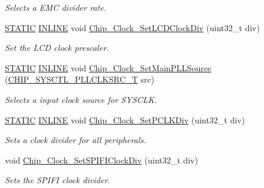 \begin{DoxyCompactItemize}
\begin{DoxyCompactList}\small\item\em Selects a E\+MC divider rate. \end{DoxyCompactList}\item 
\hyperlink{group__LPC__Types__Public__Macros_ga10b2d890d871e1489bb02b7e70d9bdfb}{S\+T\+A\+T\+IC} \hyperlink{group__LPC__Types__Public__Types_ga2eb6f9e0395b47b8d5e3eeae4fe0c116}{I\+N\+L\+I\+NE} void \hyperlink{group__CLOCK__17XX__40XX_ga1ce42fc25d5a91dadf0d7c6c9b3c3f34}{Chip\+\_\+\+Clock\+\_\+\+Set\+L\+C\+D\+Clock\+Div} (uint32\+\_\+t div)
\begin{DoxyCompactList}\small\item\em Set the L\+CD clock prescaler. \end{DoxyCompactList}\item 
\hyperlink{group__LPC__Types__Public__Macros_ga10b2d890d871e1489bb02b7e70d9bdfb}{S\+T\+A\+T\+IC} \hyperlink{group__LPC__Types__Public__Types_ga2eb6f9e0395b47b8d5e3eeae4fe0c116}{I\+N\+L\+I\+NE} void \hyperlink{group__CLOCK__17XX__40XX_gadeba4ec298c7ad2cf1627f9add199d02}{Chip\+\_\+\+Clock\+\_\+\+Set\+Main\+P\+L\+L\+Source} (\hyperlink{group__CLOCK__17XX__40XX_gacda7fd6d13922330ce9344dbc4ec85b7}{C\+H\+I\+P\+\_\+\+S\+Y\+S\+C\+T\+L\+\_\+\+P\+L\+L\+C\+L\+K\+S\+R\+C\+\_\+T} src)
\begin{DoxyCompactList}\small\item\em Selects a input clock source for S\+Y\+S\+C\+LK. \end{DoxyCompactList}\item 
\hyperlink{group__LPC__Types__Public__Macros_ga10b2d890d871e1489bb02b7e70d9bdfb}{S\+T\+A\+T\+IC} \hyperlink{group__LPC__Types__Public__Types_ga2eb6f9e0395b47b8d5e3eeae4fe0c116}{I\+N\+L\+I\+NE} void \hyperlink{group__CLOCK__17XX__40XX_ga847b9fe292e8d5461c02750a21d34885}{Chip\+\_\+\+Clock\+\_\+\+Set\+P\+C\+L\+K\+Div} (uint32\+\_\+t div)
\begin{DoxyCompactList}\small\item\em Sets a clock divider for all peripherals. \end{DoxyCompactList}\item 
void \hyperlink{group__CLOCK__17XX__40XX_ga2cde27bd6930a102a0b2b1b7f0561200}{Chip\+\_\+\+Clock\+\_\+\+Set\+S\+P\+I\+F\+I\+Clock\+Div} (uint32\+\_\+t div)
\begin{DoxyCompactList}\small\item\em Sets the S\+P\+I\+FI clock divider. \end{DoxyCompactList}\item 

\end{DoxyCompactItemize}
